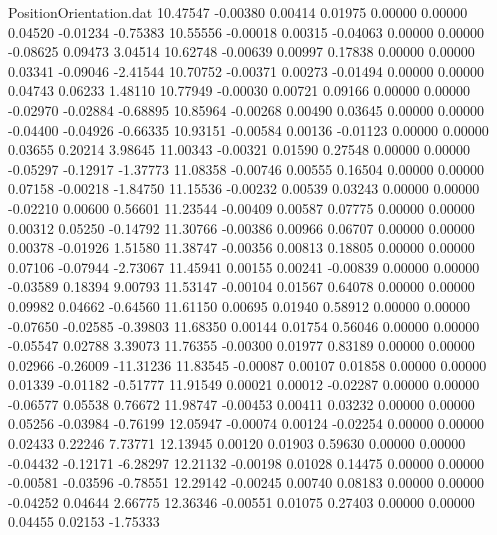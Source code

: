 \begin{filecontents}{PositionOrientation.dat}
  10.47547   -0.00380    0.00414     0.01975    0.00000    0.00000    0.04520   -0.01234   -0.75383
  10.55556   -0.00018    0.00315    -0.04063    0.00000    0.00000   -0.08625    0.09473    3.04514
  10.62748   -0.00639    0.00997     0.17838    0.00000    0.00000    0.03341   -0.09046   -2.41544
  10.70752   -0.00371    0.00273    -0.01494    0.00000    0.00000    0.04743    0.06233    1.48110
  10.77949   -0.00030    0.00721     0.09166    0.00000    0.00000   -0.02970   -0.02884   -0.68895
  10.85964   -0.00268    0.00490     0.03645    0.00000    0.00000   -0.04400   -0.04926   -0.66335
  10.93151   -0.00584    0.00136    -0.01123    0.00000    0.00000    0.03655    0.20214    3.98645
  11.00343   -0.00321    0.01590     0.27548    0.00000    0.00000   -0.05297   -0.12917   -1.37773
  11.08358   -0.00746    0.00555     0.16504    0.00000    0.00000    0.07158   -0.00218   -1.84750
  11.15536   -0.00232    0.00539     0.03243    0.00000    0.00000   -0.02210    0.00600    0.56601
  11.23544   -0.00409    0.00587     0.07775    0.00000    0.00000    0.00312    0.05250   -0.14792
  11.30766   -0.00386    0.00966     0.06707    0.00000    0.00000    0.00378   -0.01926    1.51580
  11.38747   -0.00356    0.00813     0.18805    0.00000    0.00000    0.07106   -0.07944   -2.73067
  11.45941    0.00155    0.00241    -0.00839    0.00000    0.00000   -0.03589    0.18394    9.00793
  11.53147   -0.00104    0.01567     0.64078    0.00000    0.00000    0.09982    0.04662   -0.64560
  11.61150    0.00695    0.01940     0.58912    0.00000    0.00000   -0.07650   -0.02585   -0.39803
  11.68350    0.00144    0.01754     0.56046    0.00000    0.00000   -0.05547    0.02788    3.39073
  11.76355   -0.00300    0.01977     0.83189    0.00000    0.00000    0.02966   -0.26009  -11.31236
  11.83545   -0.00087    0.00107     0.01858    0.00000    0.00000    0.01339   -0.01182   -0.51777
  11.91549    0.00021    0.00012    -0.02287    0.00000    0.00000   -0.06577    0.05538    0.76672
  11.98747   -0.00453    0.00411     0.03232    0.00000    0.00000    0.05256   -0.03984   -0.76199
  12.05947   -0.00074    0.00124    -0.02254    0.00000    0.00000    0.02433    0.22246    7.73771
  12.13945    0.00120    0.01903     0.59630    0.00000    0.00000   -0.04432   -0.12171   -6.28297
  12.21132   -0.00198    0.01028     0.14475    0.00000    0.00000   -0.00581   -0.03596   -0.78551
  12.29142   -0.00245    0.00740     0.08183    0.00000    0.00000   -0.04252    0.04644    2.66775
  12.36346   -0.00551    0.01075     0.27403    0.00000    0.00000    0.04455    0.02153   -1.75333

\end{filecontents}
